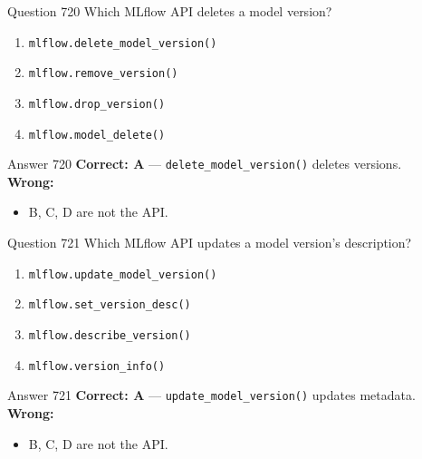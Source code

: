\documentclass[aspectratio=169,11pt]{beamer}
\begin{document}
	\begin{frame}{Question 720}
		Which MLflow API deletes a model version?
		\begin{enumerate}[label=\Alph*.]
			\item \texttt{mlflow.delete\_model\_version()}
			\item \texttt{mlflow.remove\_version()}
			\item \texttt{mlflow.drop\_version()}
			\item \texttt{mlflow.model\_delete()}
		\end{enumerate}
	\end{frame}
	\begin{frame}{Answer 720}
		\textbf{Correct: A} --- \texttt{delete\_model\_version()} deletes versions.\\
		\vspace{0.5em}
		\textbf{Wrong:}
		\begin{itemize}
			\item B, C, D are not the API.
		\end{itemize}
	\end{frame}
	
	\begin{frame}{Question 721}
		Which MLflow API updates a model version's description?
		\begin{enumerate}[label=\Alph*.]
			\item \texttt{mlflow.update\_model\_version()}
			\item \texttt{mlflow.set\_version\_desc()}
			\item \texttt{mlflow.describe\_version()}
			\item \texttt{mlflow.version\_info()}
		\end{enumerate}
	\end{frame}
	\begin{frame}{Answer 721}
		\textbf{Correct: A} --- \texttt{update\_model\_version()} updates metadata.\\
		\vspace{0.5em}
		\textbf{Wrong:}
		\begin{itemize}
			\item B, C, D are not the API.
		\end{itemize}
	\end{frame}
	
\end{document}
